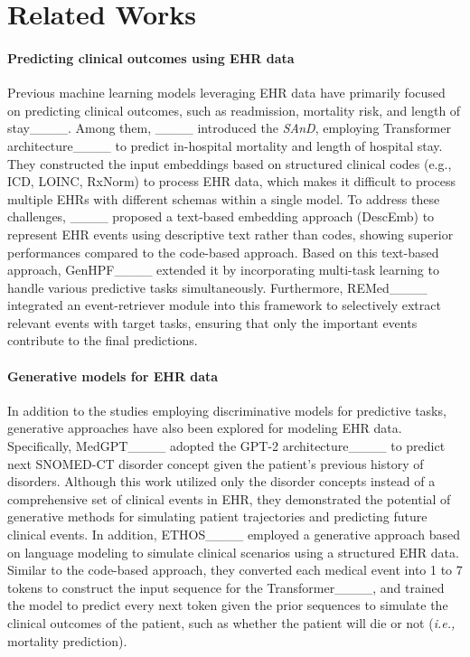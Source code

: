 \section{Related Works}
\paragraph{Predicting clinical outcomes using EHR data}
Previous machine learning models leveraging EHR data have primarily focused on predicting clinical outcomes, such as readmission, mortality risk, and length of stay____.
Among them, ____ introduced the \textit{SAnD}, employing Transformer architecture____ to predict in-hospital mortality and length of hospital stay.
They constructed the input embeddings based on structured clinical codes (e.g., ICD, LOINC, RxNorm) to process EHR data, which makes it difficult to process multiple EHRs with different schemas within a single model.
To address these challenges, ____ proposed a text-based embedding approach (DescEmb) to represent EHR events using descriptive text rather than codes, showing superior performances compared to the code-based approach.
Based on this text-based approach, GenHPF____ extended it by incorporating multi-task learning to handle various predictive tasks simultaneously.
Furthermore, REMed____ integrated an event-retriever module into this framework to selectively extract relevant events with target tasks, ensuring that only the important events contribute to the final predictions.

\paragraph{Generative models for EHR data}
In addition to the studies employing discriminative models for predictive tasks, generative approaches have also been explored for modeling EHR data.
Specifically, MedGPT____ adopted the GPT-2 architecture____ to predict next SNOMED-CT disorder concept given the patient's previous history of disorders.
Although this work utilized only the disorder concepts instead of a comprehensive set of clinical events in EHR, they demonstrated the potential of generative methods for simulating patient trajectories and predicting future clinical events.
In addition, ETHOS____ employed a generative approach based on language modeling to simulate clinical scenarios using a structured EHR data.
Similar to the code-based approach, they converted each medical event into 1 to 7 tokens to construct the input sequence for the Transformer____, and trained the model to predict every next token given the prior sequences to simulate the clinical outcomes of the patient, such as whether the patient will die or not (\textit{i.e.,} mortality prediction).

